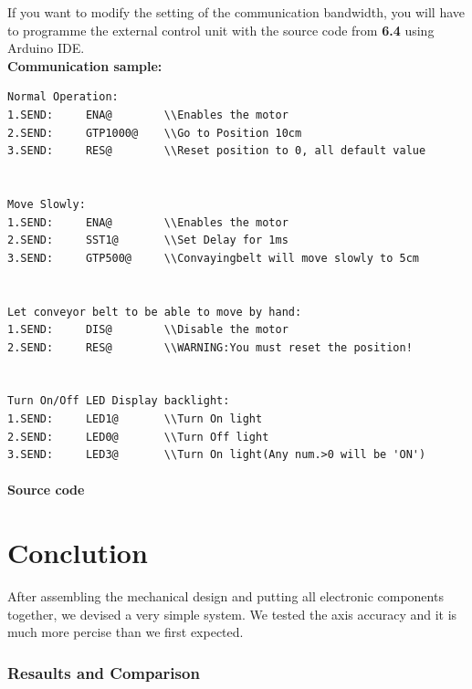 \documentclass[11pt,a4paper]{article}
\begin{document}
If you want to modify the setting of the communication bandwidth, you will have to programme the external control unit with the source code from \textbf{6.4} using Arduino IDE.\\

\textbf{Communication sample:}
\begin{lstlisting}
Normal Operation:
1.SEND:		ENA@		\\Enables the motor
2.SEND:		GTP1000@	\\Go to Position 10cm
3.SEND:		RES@		\\Reset position to 0, all default value


Move Slowly:
1.SEND:		ENA@		\\Enables the motor
2.SEND:		SST1@		\\Set Delay for 1ms
3.SEND:		GTP500@		\\Convayingbelt will move slowly to 5cm


Let conveyor belt to be able to move by hand:
1.SEND:		DIS@		\\Disable the motor
2.SEND:		RES@		\\WARNING:You must reset the position!


Turn On/Off LED Display backlight:
1.SEND:		LED1@		\\Turn On light
2.SEND:		LED0@		\\Turn Off light
3.SEND:		LED3@		\\Turn On light(Any num.>0 will be 'ON')

\end{lstlisting}


\newpage
\subsection{Source code}



\newpage
\part{Conclution} 
After assembling the mechanical design and putting all electronic components together, we devised a very simple system. We tested the axis accuracy and it is much more percise than we first expected.\\
\section{Resaults and Comparison}
\end{document}
